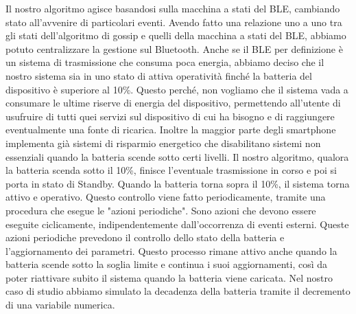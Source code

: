 Il nostro algoritmo agisce basandosi sulla macchina a stati del BLE, cambiando stato all'avvenire di particolari eventi. Avendo fatto una relazione uno a uno tra gli stati dell'algoritmo di gossip e quelli della macchina a stati del BLE, abbiamo potuto centralizzare la gestione sul Bluetooth. Anche se il BLE per definizione è un sistema di trasmissione che consuma poca energia, abbiamo deciso che il nostro sistema sia in uno stato di attiva operatività finché la batteria del dispositivo è superiore al 10\%. Questo perché, non vogliamo che il sistema vada a consumare le ultime riserve di energia del dispositivo, permettendo all'utente di usufruire di tutti quei servizi sul dispositivo di cui ha bisogno e di raggiungere eventualmente una fonte di ricarica. Inoltre la maggior parte degli smartphone implementa già sistemi di risparmio energetico che disabilitano sistemi non essenziali quando la batteria scende sotto certi livelli.
Il nostro algoritmo, qualora la batteria scenda sotto il 10\%, finisce l'eventuale trasmissione in corso e poi si porta in stato di Standby. Quando la batteria torna sopra il 10\%, il sistema torna attivo e operativo. Questo controllo viene fatto periodicamente, tramite una procedura che esegue le "azioni periodiche". Sono azioni che devono essere eseguite ciclicamente, indipendentemente dall'occorrenza di eventi esterni. Queste azioni periodiche prevedono il controllo dello stato della batteria e l'aggiornamento dei parametri. Questo processo rimane attivo anche quando la batteria scende sotto la soglia limite e continua i suoi aggiornamenti, così da poter riattivare subito il sistema quando la batteria viene caricata. Nel nostro caso di studio abbiamo simulato la decadenza della batteria tramite il decremento di una variabile numerica.

